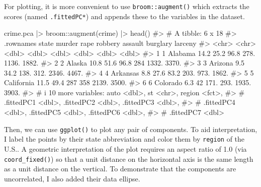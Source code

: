 \documentclass[
  letterpaper,
  10pt,
  krantz2]{krantz}
\makeatletter
\newenvironment{Shaded}{\begin{snugshade}}{\end{snugshade}}
\newcommand{\CommentTok}[1]{\textcolor[rgb]{0.37,0.37,0.37}{#1}}
\newcommand{\FunctionTok}[1]{\textcolor[rgb]{0.28,0.35,0.67}{#1}}
\newcommand{\NormalTok}[1]{\textcolor[rgb]{0.00,0.23,0.31}{#1}}
\newcommand{\SpecialCharTok}[1]{\textcolor[rgb]{0.37,0.37,0.37}{#1}}
\newenvironment{kframe}{%
  \medskip{}
  \setlength{\fboxsep}{.8em}
  \def\at@end@of@kframe{}%
  \ifinner\ifhmode%
  \def\at@end@of@kframe{\end{minipage}}%
  \begin{minipage}{\columnwidth}%
  \fi\fi%
  \def\FrameCommand##1{\hskip\@totalleftmargin \hskip-\fboxsep
  \colorbox{shadecolor}{##1}\hskip-\fboxsep
      \hskip-\linewidth \hskip-\@totalleftmargin \hskip\columnwidth}%
  \MakeFramed {\advance\hsize-\width
    \@totalleftmargin\z@ \linewidth\hsize
    \@setminipage}}%
{\par\unskip\endMakeFramed%
  \at@end@of@kframe}
\renewenvironment{Shaded}{\begin{kframe}}{\end{kframe}}
\makeatother
\begin{document}
For plotting, it is more convenient to use \texttt{broom::augment()}
which extracts the scores (named \texttt{.fittedPC*}) and appends these
to the variables in the dataset.

\begin{Shaded}
\begin{Highlighting}[]
\NormalTok{crime.pca }\SpecialCharTok{|\textgreater{}}
\NormalTok{  broom}\SpecialCharTok{::}\FunctionTok{augment}\NormalTok{(crime) }\SpecialCharTok{|\textgreater{}} \FunctionTok{head}\NormalTok{()}
\CommentTok{\#\textgreater{} \# A tibble: 6 x 18}
\CommentTok{\#\textgreater{}   .rownames state      murder  rape robbery assault burglary larceny}
\CommentTok{\#\textgreater{}   \textless{}chr\textgreater{}     \textless{}chr\textgreater{}       \textless{}dbl\textgreater{} \textless{}dbl\textgreater{}   \textless{}dbl\textgreater{}   \textless{}dbl\textgreater{}    \textless{}dbl\textgreater{}   \textless{}dbl\textgreater{}}
\CommentTok{\#\textgreater{} 1 1         Alabama      14.2  25.2    96.8    278.    1136.   1882.}
\CommentTok{\#\textgreater{} 2 2         Alaska       10.8  51.6    96.8    284     1332.   3370.}
\CommentTok{\#\textgreater{} 3 3         Arizona       9.5  34.2   138.     312.    2346.   4467.}
\CommentTok{\#\textgreater{} 4 4         Arkansas      8.8  27.6    83.2    203.     973.   1862.}
\CommentTok{\#\textgreater{} 5 5         California   11.5  49.4   287      358     2139.   3500.}
\CommentTok{\#\textgreater{} 6 6         Colorado      6.3  42     171.     293.    1935.   3903.}
\CommentTok{\#\textgreater{} \# i 10 more variables: auto \textless{}dbl\textgreater{}, st \textless{}chr\textgreater{}, region \textless{}fct\textgreater{},}
\CommentTok{\#\textgreater{} \#   .fittedPC1 \textless{}dbl\textgreater{}, .fittedPC2 \textless{}dbl\textgreater{}, .fittedPC3 \textless{}dbl\textgreater{},}
\CommentTok{\#\textgreater{} \#   .fittedPC4 \textless{}dbl\textgreater{}, .fittedPC5 \textless{}dbl\textgreater{}, .fittedPC6 \textless{}dbl\textgreater{},}
\CommentTok{\#\textgreater{} \#   .fittedPC7 \textless{}dbl\textgreater{}}
\end{Highlighting}
\end{Shaded}

Then, we can use \texttt{ggplot()} to plot any pair of components. To
aid interpretation, I label the points by their state abbreviation and
color them by \texttt{region} of the U.S.. A geometric interpretation of
the plot requires an aspect ratio of 1.0 (via \texttt{coord\_fixed()})
so that a unit distance on the horizontal axis is the same length as a
unit distance on the vertical. To demonstrate that the components are
uncorrelated, I also added their data ellipse.
\end{document}

